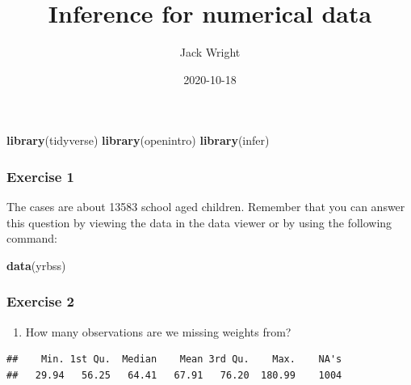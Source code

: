 \documentclass[
]{article}
\title{Inference for numerical data}
\author{Jack Wright}
\date{2020-10-18}
\newenvironment{Shaded}{\begin{snugshade}}{\end{snugshade}}
\newcommand{\KeywordTok}[1]{\textcolor[rgb]{0.13,0.29,0.53}{\textbf{#1}}}
\newcommand{\NormalTok}[1]{#1}
\newcommand{\OperatorTok}[1]{\textcolor[rgb]{0.81,0.36,0.00}{\textbf{#1}}}
\newcommand{\StringTok}[1]{\textcolor[rgb]{0.31,0.60,0.02}{#1}}
\providecommand{\tightlist}{%
  \setlength{\itemsep}{0pt}\setlength{\parskip}{0pt}}
\begin{document}
\maketitle

\begin{Shaded}
\begin{Highlighting}[]
\KeywordTok{library}\NormalTok{(tidyverse)}
\KeywordTok{library}\NormalTok{(openintro)}
\KeywordTok{library}\NormalTok{(infer)}
\end{Highlighting}
\end{Shaded}

\hypertarget{exercise-1}{%
\subsubsection{Exercise 1}\label{exercise-1}}

The cases are about 13583 school aged children. Remember that you can
answer this question by viewing the data in the data viewer or by using
the following command:

\begin{Shaded}
\begin{Highlighting}[]
\KeywordTok{data}\NormalTok{(yrbss)}
\end{Highlighting}
\end{Shaded}

\hypertarget{exercise-2}{%
\subsubsection{Exercise 2}\label{exercise-2}}

\begin{enumerate}
\def\labelenumi{\arabic{enumi}.}
\tightlist
\item
  How many observations are we missing weights from?
\end{enumerate}

\begin{Shaded}
\end{Shaded}

\begin{verbatim}
##    Min. 1st Qu.  Median    Mean 3rd Qu.    Max.    NA's 
##   29.94   56.25   64.41   67.91   76.20  180.99    1004
\end{verbatim}

\begin{Shaded}
\end{Shaded}
\end{document}
